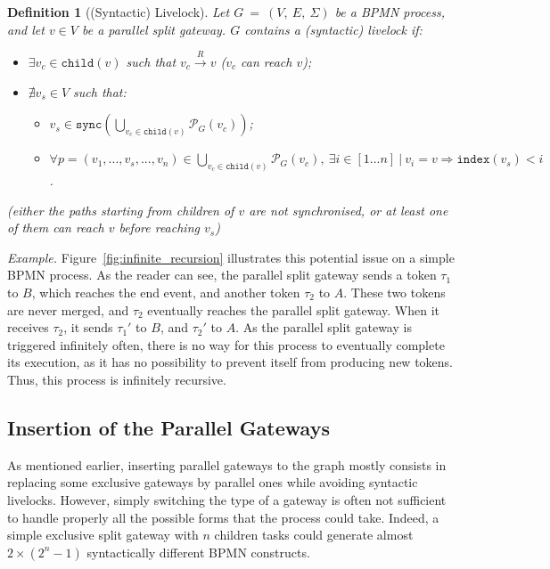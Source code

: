 \documentclass{article}
\newcommand{\childrenof}[1]{\ensuremath{\mathtt{child}(#1)}}
\newcommand{\closedarray}[2]{[#1...#2]}
\newcommand{\example}{\textit{Example. }}
\newcommand{\graph}{G~=~(V,~E,~\Sigma)}
\newcommand{\indexof}[1]{\mathtt{index}(#1)}
\newcommand{\isreachablefrom}[2]{#1 \xrightarrow{R} #2}
\newcommand{\pathsof}[2]{\mathcal{P}_{#1}(#2)}
\newcommand{\sync}[1]{\mathtt{sync}(#1)}
\newtheorem{definition}{Definition}
\begin{document}
	
	\begin{definition}[(Syntactic) Livelock]\label{def:infinite_recursion}
		Let $\graph$ be a BPMN process, and let $v \in V$ be a parallel split gateway.
		$G$ contains a \textnormal{(syntactic) livelock} if:
		
		\begin{itemize}
			\setlength\itemsep{-0.4em}
			\item[---] $\exists v_c \in \childrenof{v}$ such that $\isreachablefrom{v_c}{v}$ ($v_c$ can reach $v$);
			\item[---] $\nexists v_s \in V$ such that:
			\begin{itemize}
				\setlength\itemsep{-0.4em}
				\item $v_s \in \sync{\bigcup\limits_{v_c \in \childrenof{v}} \pathsof{G}{v_c}}$;
				\item $\forall p = (v_1, ..., v_s, ..., v_n) \in \bigcup\limits_{v_c \in \childrenof{v}} \pathsof{G}{v_c},\ \exists i \in \closedarray{1}{n}\ \vert\ v_i = v \Rightarrow \indexof{v_s} < i$.
			\end{itemize}
		\end{itemize}
		
		(either the paths starting from children of $v$ are not synchronised, or at least one of them can reach $v$ before reaching $v_s$)
	\end{definition}
	
	\example Figure~\ref{fig:infinite_recursion} illustrates this potential issue on a simple BPMN process.
	As the reader can see, the parallel split gateway sends a token $\tau_1$ to $B$, which reaches the end event, and another token $\tau_2$ to $A$.
	These two tokens are never merged, and $\tau_2$ eventually reaches the parallel split gateway.
	When it receives $\tau_2$, it sends $\tau_1'$ to $B$, and $\tau_2'$ to $A$.
	As the parallel split gateway is triggered infinitely often, there is no way for this process to eventually complete its execution, as it has no possibility to prevent itself from producing new tokens.
	Thus, this process is infinitely recursive.

	
	\subsection{Insertion of the Parallel Gateways}
	
	As mentioned earlier, inserting parallel gateways to the graph mostly consists in replacing some exclusive gateways by parallel ones while avoiding syntactic livelocks.
	However, simply switching the type of a gateway is often not sufficient to handle properly all the possible forms that the process could take.
	Indeed, a simple exclusive split gateway with $n$ children tasks could generate almost $2 \times (2^n - 1)$ syntactically different BPMN constructs.
	
\end{document}
